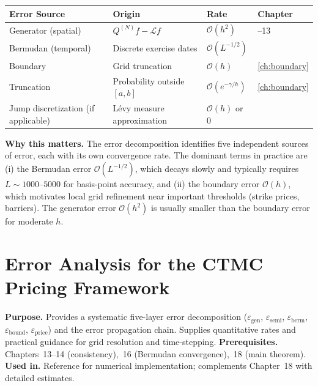 \documentclass[11pt,a4paper,openany]{book}
\theoremstyle{definition}
\theoremstyle{plain}
\theoremstyle{remark}
\newcommand{\1}{\mathbbm{1}}
\begin{document}
\begin{center}
\begin{tabular}{>{\raggedright\arraybackslash}p{3cm}>{\raggedright\arraybackslash}p{3cm}>{\raggedright\arraybackslash}p{3cm}>{\raggedright\arraybackslash}p{3cm}}
\toprule
\textbf{Error Source} & \textbf{Origin} & \textbf{Rate} & \textbf{Chapter} \\
\midrule
Generator (spatial) & $Q^{(N)} f - \mathcal{L} f$ & $\mathcal{O}(h^{2})$ & 12--13 \\
Bermudan (temporal) & Discrete exercise dates & $\mathcal{O}(L^{-1/2})$ & 16 \\
Boundary & Grid truncation & $\mathcal{O}(h)$ & \ref{ch:boundary} \\
Truncation & Probability outside $[a,b]$ & $\mathcal{O}(e^{-\gamma/h})$ & \ref{ch:boundary} \\
Jump discretization (if applicable) & L\'{e}vy measure approximation & $\mathcal{O}(h)$ or $0$ & 14 \\
\bottomrule
\end{tabular}
\end{center}

\medskip
\noindent\textbf{Why this matters.} The error decomposition identifies five independent sources of error, each with its own convergence rate. The dominant terms in practice are (i) the Bermudan error $\mathcal{O}(L^{-1/2})$, which decays slowly and typically requires $L \sim 1000$--$5000$ for basis-point accuracy, and (ii) the boundary error $\mathcal{O}(h)$, which motivates local grid refinement near important thresholds (strike prices, barriers). The generator error $\mathcal{O}(h^{2})$ is usually smaller than the boundary error for moderate $h$.



\chapter{Error Analysis for the CTMC Pricing Framework}

\noindent\textbf{Purpose.} Provides a systematic five-layer error decomposition ($\varepsilon_{\text{gen}}$, $\varepsilon_{\text{semi}}$, $\varepsilon_{\text{berm}}$, $\varepsilon_{\text{bound}}$, $\varepsilon_{\text{price}}$) and the error propagation chain. Supplies quantitative rates and practical guidance for grid resolution and time-stepping.
\textbf{Prerequisites.} Chapters~13--14 (consistency),~16 (Bermudan convergence),~18 (main theorem).
\textbf{Used in.} Reference for numerical implementation; complements Chapter~18 with detailed estimates.
\end{document}
